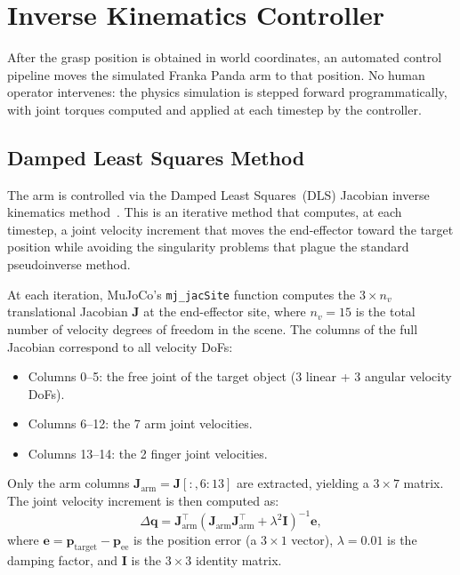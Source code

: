 \documentclass[11pt,a4paper]{report}
\begin{document}
\section{Inverse Kinematics Controller}
\label{sec:ik_controller}

After the grasp position is obtained in world coordinates, an automated control pipeline moves the simulated Franka Panda arm to that position. No human operator intervenes: the physics simulation is stepped forward programmatically, with joint torques computed and applied at each timestep by the controller.

\subsection{Damped Least Squares Method}

The arm is controlled via the Damped Least Squares~(DLS) Jacobian inverse kinematics method~\cite{nakamura1986inverse}. This is an iterative method that computes, at each timestep, a joint velocity increment that moves the end-effector toward the target position while avoiding the singularity problems that plague the standard pseudoinverse method.

At each iteration, MuJoCo's \texttt{mj\_jacSite} function computes the $3 \times n_v$ translational Jacobian $\mathbf{J}$ at the end-effector site, where $n_v = 15$ is the total number of velocity degrees of freedom in the scene. The columns of the full Jacobian correspond to all velocity DoFs:
\begin{itemize}
  \item Columns 0--5: the free joint of the target object (3 linear + 3 angular velocity DoFs).
  \item Columns 6--12: the 7 arm joint velocities.
  \item Columns 13--14: the 2 finger joint velocities.
\end{itemize}

Only the arm columns $\mathbf{J}_{\text{arm}} = \mathbf{J}[:, 6{:}13]$ are extracted, yielding a $3 \times 7$ matrix. The joint velocity increment is then computed as:
\begin{equation}
  \Delta\mathbf{q} = \mathbf{J}_{\text{arm}}^{\top}
    \left(\mathbf{J}_{\text{arm}} \mathbf{J}_{\text{arm}}^{\top}
    + \lambda^2 \mathbf{I}\right)^{-1} \mathbf{e},
  \label{eq:dls}
\end{equation}
where $\mathbf{e} = \mathbf{p}_{\text{target}} - \mathbf{p}_{\text{ee}}$ is the position error (a $3 \times 1$ vector), $\lambda = 0.01$ is the damping factor, and $\mathbf{I}$ is the $3 \times 3$ identity matrix.
\end{document}
